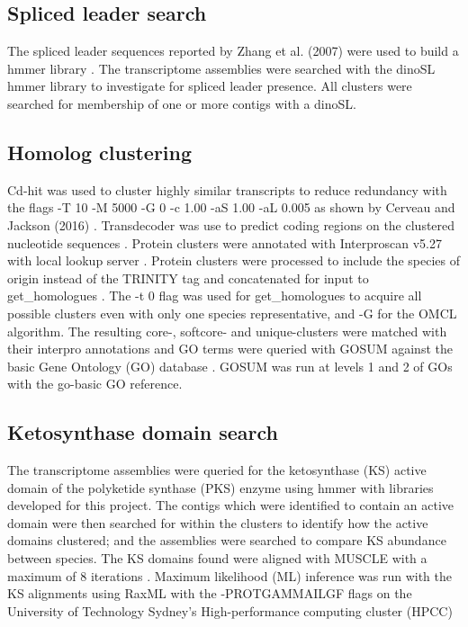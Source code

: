 \documentclass[12pt]{article}
\begin{document}
\subsection{Spliced leader search}
The spliced leader sequences reported by Zhang et al. (2007) were used to build a hmmer library \cite{zhang2007spliced}. 
The transcriptome assemblies were searched with the dinoSL hmmer library to investigate for spliced leader presence. 
All clusters were searched for membership of one or more contigs with a dinoSL.

\subsection{Homolog clustering}
Cd-hit was used to cluster highly similar transcripts to reduce redundancy with the flags -T 10 -M 5000 -G 0 -c 1.00 -aS 1.00 -aL 0.005 as shown by Cerveau and Jackson (2016) \cite{cerveau2016combining,fu2012cd}. 
Transdecoder was use to predict coding regions on the clustered nucleotide sequences \cite{haas2016transdecoder}.
Protein clusters were annotated with Interproscan v5.27 with local lookup server \cite{quevillon2005interproscan}.
Protein clusters were processed to include the species of origin instead of the TRINITY tag and concatenated for input to get\_homologues \cite{vinuesa2015robust}. 
The -t 0 flag was used for get\_homologues to acquire all possible clusters even with only one species representative, and -G for the OMCL algorithm. 
The resulting core-, softcore- and unique-clusters were matched with their interpro annotations and GO terms were queried with GOSUM against the basic Gene Ontology (GO) database \cite{timgosum,ashburner2000gene,gene2016expansion}. 
GOSUM was run at levels 1 and 2 of GOs with the go-basic GO reference. 

\subsection{Ketosynthase domain search}
The transcriptome assemblies were queried for the ketosynthase (KS) active domain of the polyketide synthase (PKS) enzyme using hmmer \cite{eddy2015hmmer} with libraries developed for this project. 
The contigs which were identified to contain an active domain were then searched for within the clusters to identify how the active domains clustered; and the assemblies were searched to compare KS abundance between species. 
The KS domains found were aligned with MUSCLE with a maximum of 8 iterations \cite{edgar2004muscle}. 
Maximum likelihood (ML) inference was run with the KS alignments using RaxML \cite{stamatakis2014raxml} with the -PROTGAMMAILGF flags on the University of Technology Sydney’s High-performance computing cluster (HPCC)\\
\end{document}
